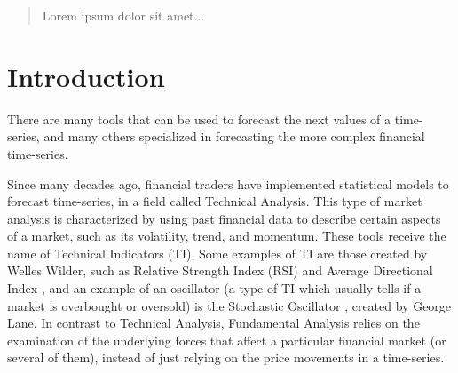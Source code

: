 \documentclass[12pt,journal,draftcls,onecolumn]{IEEEtran}
\begin{document}








\begin{abstract}
Lorem ipsum dolor sit amet...
\end{abstract}

\section{Introduction}

There are many tools that can be used to forecast the next values of a time-series, and many others specialized in forecasting the more complex financial time-series.  %

Since many decades ago, financial traders have implemented statistical models to forecast time-series, in a field called Technical Analysis. %
This type of market analysis is characterized by using past financial data to describe 
certain aspects of a market, such as its volatility, trend, and momentum.%
These tools receive the name of Technical Indicators (TI). %
Some examples of TI are those created by Welles Wilder, such as Relative Strength Index (RSI) and Average Directional Index \cite{wilder1978new}, and an example of an oscillator (a type of TI which usually tells if a market is overbought or oversold) is the Stochastic Oscillator \cite{schirding1984stochastic}, created by George Lane. %
In contrast to Technical Analysis, Fundamental Analysis relies on the examination of the underlying forces that affect a particular financial market (or several of them), instead of just relying on the price movements in a time-series.
\end{document}
